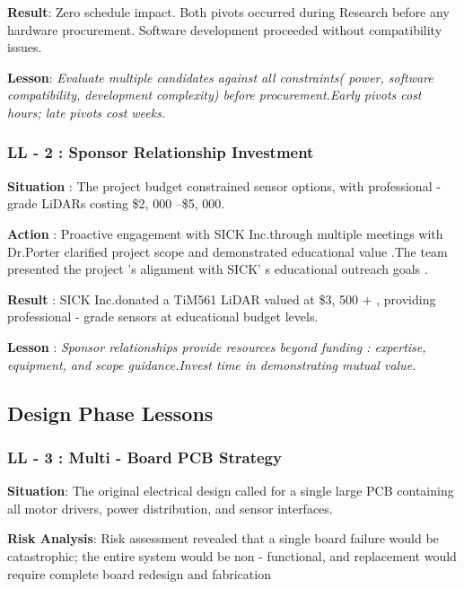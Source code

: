 \textbf{Result}: Zero schedule impact. Both pivots occurred during Research before any hardware procurement. Software development proceeded without compatibility issues.

\textbf{Lesson}: \textit{
  Evaluate multiple candidates against all constraints(
      power, software compatibility, development complexity)
      before procurement.Early pivots cost hours;
  late pivots cost weeks.
}

\subsubsection { LL - 2 : Sponsor Relationship Investment }

\textbf{Situation}
    : The project budget constrained sensor options,
      with professional - grade LiDARs costing \$2,
      000 --\$5,
      000.

\textbf{Action}
    : Proactive engagement with SICK Inc.through multiple meetings with
          Dr.Porter clarified project scope and demonstrated educational value
              .The team presented the
                  project 's alignment with SICK' s educational outreach goals
              .

\textbf{Result} : SICK Inc.donated a TiM561 LiDAR valued at \$3,
      500 +
    ,
      providing professional - grade sensors at educational budget levels.

\textbf{Lesson} : \textit {
  Sponsor relationships provide resources beyond funding
      : expertise,
        equipment,
        and scope guidance.Invest time in demonstrating mutual value.
}

\subsection { Design Phase Lessons }

\subsubsection { LL - 3 : Multi - Board PCB Strategy }

\textbf{Situation}: The original electrical design called for a single large PCB containing all motor drivers, power distribution, and sensor interfaces.

\textbf{Risk Analysis}: Risk assessment revealed that a single board failure would be catastrophic;
the entire system would be non - functional,
    and replacement would require complete board redesign and fabrication

